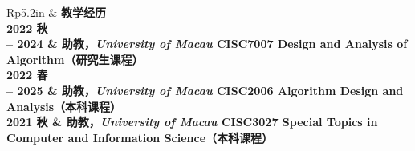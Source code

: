 \documentclass[UTF8, fontset=none, letterpaper, 11pt]{ctexart}
\newcommand{\headingfont}{\Large\bfseries\color{OliveGreen}}
\newenvironment{SectionTable}[1]{
  \renewcommand*{\arraystretch}{1.2}
  \setlength{\tabcolsep}{10pt}
  \begin{longtable}{Rp{5.2in}} & #1 \\}
{\end{longtable}\vspace{-1cm}}
\begin{document}
\begin{SectionTable}{\headingfont 教学经历}
2022 秋 \\-- 2024 &
\textbf{助教}，\textit{University of Macau}\newline
CISC7007 Design and Analysis of Algorithm（研究生课程）\\

2022 春 \\-- 2025 &
\textbf{助教}，\textit{University of Macau}\newline
CISC2006 Algorithm Design and Analysis（本科课程）\\

2021 秋 &
\textbf{助教}，\textit{University of Macau}\newline
CISC3027 Special Topics in Computer and Information Science（本科课程）\\
\end{SectionTable}
\end{document}
